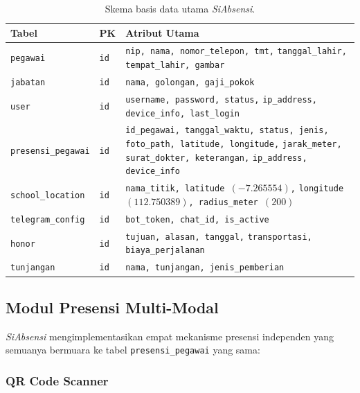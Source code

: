 \documentclass[12pt,a4paper]{article}
\newcommand{\sistem}{\textit{SiAbsensi}}
\begin{document}
\begin{table}[htbp]
\centering
\caption{Skema basis data utama \sistem{}.}
\label{tab:skema}
\small
\renewcommand{\arraystretch}{1.15}
\begin{tabular}{llp{5.5cm}}
\toprule
\textbf{Tabel} & \textbf{PK} & \textbf{Atribut Utama} \\
\midrule
\texttt{pegawai} & \texttt{id} &
  \texttt{nip, nama, nomor\_telepon, tmt,}\newline
  \texttt{tanggal\_lahir, tempat\_lahir, gambar} \\
\texttt{jabatan} & \texttt{id} &
  \texttt{nama, golongan, gaji\_pokok} \\
\texttt{user} & \texttt{id} &
  \texttt{username, password, status,}\newline
  \texttt{ip\_address, device\_info, last\_login} \\
\texttt{presensi\_pegawai} & \texttt{id} &
  \texttt{id\_pegawai, tanggal\_waktu, status, jenis,}\newline
  \texttt{foto\_path, latitude, longitude,}\newline
  \texttt{jarak\_meter, surat\_dokter, keterangan,}\newline
  \texttt{ip\_address, device\_info} \\
\texttt{school\_location} & \texttt{id} &
  \texttt{nama\_titik, latitude $(-7.265554)$,}\newline
  \texttt{longitude $(112.750389)$, radius\_meter $(200)$} \\
\texttt{telegram\_config} & \texttt{id} &
  \texttt{bot\_token, chat\_id, is\_active} \\
\texttt{honor} & \texttt{id} &
  \texttt{tujuan, alasan, tanggal,}\newline
  \texttt{transportasi, biaya\_perjalanan} \\
\texttt{tunjangan} & \texttt{id} &
  \texttt{nama, tunjangan, jenis\_pemberian} \\
\bottomrule
\end{tabular}
\end{table}

\subsection{Modul Presensi Multi-Modal}

\sistem{} mengimplementasikan empat mekanisme presensi independen yang
semuanya bermuara ke tabel \texttt{presensi\_pegawai} yang sama:

\subsubsection{QR Code Scanner}
\end{document}
